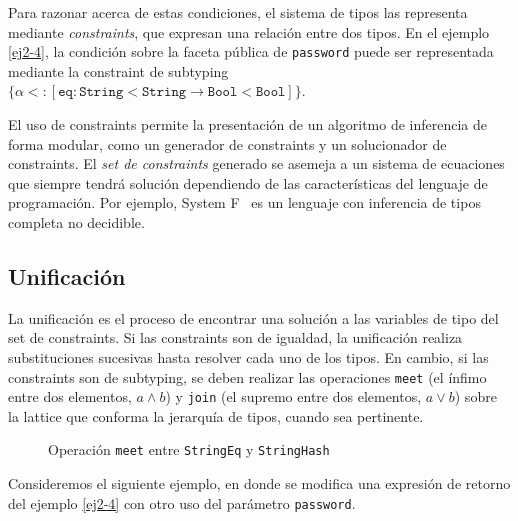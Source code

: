 Para razonar acerca de estas condiciones, el sistema de tipos las representa mediante \emph{constraints}, que expresan una relación entre dos tipos. En el ejemplo \ref{ej2-4}, la condición sobre la faceta pública de \texttt{password} puede ser representada mediante la constraint de subtyping $\{\alpha <: [\mathtt{eq} : \mathtt{String<String} \rightarrow \mathtt{Bool<Bool}]\}$.

El uso de constraints permite la presentación de un algoritmo de inferencia de forma modular, como un generador de constraints y un solucionador de constraints. El \emph{set de constraints} generado se asemeja a un sistema de ecuaciones que siempre tendrá solución dependiendo de las características del lenguaje de programación. Por ejemplo, System F~\cite{WELLS1999111} es un lenguaje con inferencia de tipos completa no decidible.

\subsection{Unificación}
La unificación es el proceso de encontrar una solución a las variables de tipo del set de constraints. Si las constraints son de igualdad, la unificación realiza substituciones sucesivas hasta resolver cada uno de los tipos. En cambio, si las constraints son de subtyping, se deben realizar las operaciones \texttt{meet} (el ínfimo entre dos elementos, $a \wedge b$) y \texttt{join} (el supremo entre dos elementos, $a \vee b$) sobre la lattice que conforma la jerarquía de tipos, cuando sea pertinente.

\begin{figure}[ht]
  \centering
  \caption{Operación \texttt{meet} entre \texttt{StringEq} y \texttt{StringHash}}
  \label{latticeInference}
\end{figure}

Consideremos el siguiente ejemplo, en donde se modifica una expresión de retorno del ejemplo \ref{ej2-4} con otro uso del parámetro \texttt{password}.

